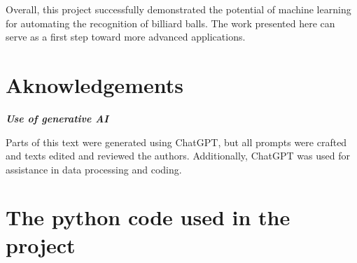 \documentclass{article}
\begin{document}
Overall, this project successfully demonstrated the potential of machine learning for automating the recognition of billiard balls. The work presented here can serve as a first step toward more advanced applications.

\pagebreak
\section{Aknowledgements}
\textbf{\textit{Use of generative AI}}

Parts of this text were generated using ChatGPT, but all prompts were crafted and texts edited and reviewed the authors. Additionally, ChatGPT was used for assistance in data processing and coding.


\printbibliography


\appendix
\section{The python code used in the project}


\end{document}
